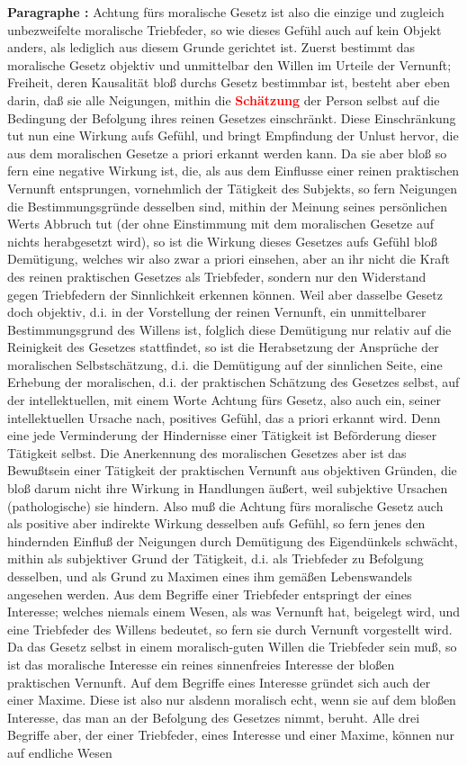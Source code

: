 \documentclass[a4paper,12pt,twoside]{book}
\newcommand{\match}[1]{\textcolor{red}{\textbf{#1}}}
\begin{document}
	\noindent\textbf{Paragraphe : }Achtung fürs moralische Gesetz ist also die einzige und zugleich unbezweifelte moralische Triebfeder, so wie dieses Gefühl auch auf kein Objekt anders, als lediglich aus diesem Grunde gerichtet ist. Zuerst bestimmt das moralische Gesetz objektiv und unmittelbar den Willen im Urteile der Vernunft; Freiheit, deren Kausalität bloß durchs Gesetz bestimmbar ist, besteht aber eben darin, daß sie alle Neigungen, mithin die \match{Schätzung} der Person selbst auf die Bedingung der Befolgung ihres reinen Gesetzes einschränkt. Diese Einschränkung tut nun eine Wirkung aufs Gefühl, und bringt Empfindung der Unlust hervor, die aus dem moralischen Gesetze a priori erkannt werden kann. Da sie aber  bloß so fern eine negative Wirkung ist, die, als aus dem Einflusse einer reinen praktischen Vernunft entsprungen, vornehmlich der Tätigkeit des Subjekts, so fern Neigungen die Bestimmungsgründe desselben sind, mithin der Meinung seines persönlichen Werts Abbruch tut (der ohne Einstimmung mit dem moralischen Gesetze auf nichts herabgesetzt wird), so ist die Wirkung dieses Gesetzes aufs Gefühl bloß Demütigung, welches wir also zwar a priori einsehen, aber an ihr nicht die Kraft des reinen praktischen Gesetzes als Triebfeder, sondern nur den Widerstand gegen Triebfedern der Sinnlichkeit erkennen können. Weil aber dasselbe Gesetz doch objektiv, d.i. in der Vorstellung der reinen Vernunft, ein unmittelbarer Bestimmungsgrund des Willens ist, folglich diese Demütigung nur relativ auf die Reinigkeit des Gesetzes stattfindet, so ist die Herabsetzung der Ansprüche der moralischen Selbstschätzung, d.i. die Demütigung auf der sinnlichen Seite, eine Erhebung der moralischen, d.i. der praktischen Schätzung des Gesetzes selbst, auf der intellektuellen, mit einem Worte Achtung fürs Gesetz, also auch ein, seiner intellektuellen Ursache nach, positives Gefühl, das a priori erkannt wird. Denn eine jede Verminderung der Hindernisse einer Tätigkeit ist Beförderung dieser Tätigkeit selbst. Die Anerkennung des moralischen Gesetzes aber ist das Bewußtsein einer Tätigkeit der praktischen Vernunft aus objektiven Gründen, die bloß darum nicht ihre Wirkung in Handlungen äußert, weil subjektive Ursachen (pathologische) sie hindern. Also muß die Achtung fürs moralische Gesetz auch als positive aber indirekte Wirkung desselben aufs Gefühl, so fern jenes den hindernden Einfluß der Neigungen durch Demütigung des Eigendünkels schwächt, mithin als subjektiver Grund der Tätigkeit, d.i. als Triebfeder zu Befolgung desselben, und als Grund zu Maximen eines ihm gemäßen Lebenswandels angesehen werden. Aus dem Begriffe einer Triebfeder entspringt der eines Interesse; welches niemals einem Wesen, als was Vernunft hat, beigelegt wird, und eine Triebfeder des Willens bedeutet, so fern sie durch Vernunft vorgestellt wird. Da das Gesetz selbst in einem moralisch-guten Willen die Triebfeder  sein muß, so ist das moralische Interesse ein reines sinnenfreies Interesse der bloßen praktischen Vernunft. Auf dem Begriffe eines Interesse gründet sich auch der einer Maxime. Diese ist also nur alsdenn moralisch echt, wenn sie auf dem bloßen Interesse, das man an der Befolgung des Gesetzes nimmt, beruht. Alle drei Begriffe aber, der einer Triebfeder, eines Interesse und einer Maxime, können nur auf endliche Wesen 
\end{document}
